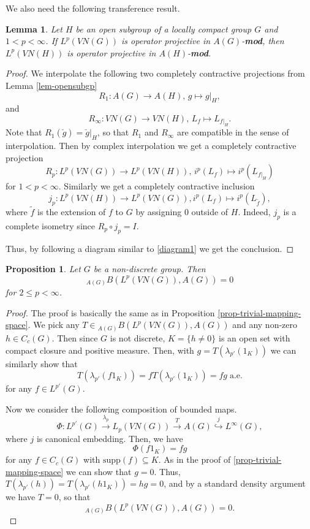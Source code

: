 \documentclass[10pt]{amsart}
\newtheorem{lem}[thm]{Lemma}
\newtheorem{prop}[thm]{Proposition}
\numberwithin{thm}{section}
\numberwithin{equation}{section}
\begin{document}
We also need the following transference result.
	\begin{lem}\label{lem-opensubgp-Lp}
	Let $H$ be an open subgroup of a locally compact group $G$ and $1<p<\infty$.
	If $L^p(VN(G))$ is operator projective in $A(G)$-{\bf mod}, then $L^p(VN(H))$ is operator projective in $A(H)$-{\bf mod}.
	\end{lem}
\begin{proof}
We interpolate the following two completely contractive projections from Lemma \ref{lem-opensubgp}
	$$R_1 : A(G) \rightarrow A(H),\, g \mapsto g|_H,$$
and
	$$R_\infty : VN(G) \rightarrow VN(H),\, L_f \mapsto L_{f|_H}.$$
Note that $R_1(\check{g}) = \check{g}|_H$, so that $R_1$ and $R_\infty$ are compatible in the sense of interpolation.
Then by complex interpolation we get a completely contractive projection
	$$R_p : L^p(VN(G)) \rightarrow L^p(VN(H)),\, i^p(L_f) \mapsto i^p(L_{f|_H})$$
for $1<p<\infty$.
Similarly we get a completely contractive inclusion $$j_p : L^p(VN(H)) \rightarrow L^p(VN(G)), i^p(L_f) \mapsto i^p(L_{\widetilde{f}}),$$
where $\widetilde{f}$ is the extension of $f$ to $G$ by assigning 0 outside of $H$. Indeed, $j_p$ is a complete isometry since $R_p\circ j_p = I$.

Thus, by following a diagram similar to \eqref{diagram1} we get the conclusion.

\end{proof}	

	\begin{prop}\label{prop-trivial-mapping-space-Lp}
	Let $G$ be a non-discrete group. Then
		$${}_{A(G)}B(L^p(VN(G)), A(G)) = 0$$
	for $2\le p< \infty$.
	\end{prop}
	\begin{proof}
The proof is basically the same as in Proposition \ref{prop-trivial-mapping-space}.
We pick any $T \in {}_{A(G)}B(L^p(VN(G)), A(G))$ and any non-zero $h \in C_c(G)$. 
Then since $G$ is not discrete, $K = \{h\neq 0\}$ is an open set with compact closure and positive measure.
Then, with $g = T(\lambda_{p'}(1_K))$ we can similarly show that
	$$T(\lambda_{p'}(f 1_K)) = f T(\lambda_{p'}(1_K)) = f g\;\text{a.e.}$$
for any $f\in L^{p'}(G)$.

Now we consider the following composition of bounded maps.
	$$\Phi : L^{p'}(G) \stackrel{\lambda_p}{\longrightarrow} L_p(VN(G)) \stackrel{T}{\longrightarrow} A(G) \stackrel{j}{\hookrightarrow} L^{\infty}(G),$$
where $j$ is canonical embedding. Then, we have
	$$\Phi(f 1_K) = f g$$
for any $f\in C_c(G)$ with $\text{supp}(f) \subseteq K$. As in the proof of \ref{prop-trivial-mapping-space} we can show that $g=0$.
Thus, $T(\lambda_{p'}(h)) = T(\lambda_{p'}(h 1_K)) = hg = 0$, and by a standard density argument we have $T = 0$, so that
	$${}_{A(G)}B(L^p(VN(G)), A(G)) = 0.$$
\end{proof}
\end{document}

